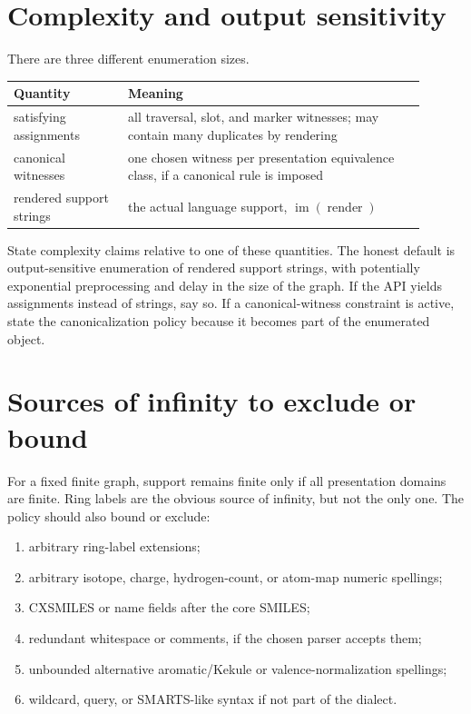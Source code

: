 \documentclass[10pt,a4paper]{article}
\newcommand{\render}{\operatorname{render}}
\newcommand{\im}{\operatorname{im}}
\theoremstyle{definition}
\theoremstyle{remark}
\begin{document}
\section{Complexity and output sensitivity}
\label{s:complexity}

There are three different enumeration sizes.

\begin{center}
\begin{tabular}{>{\raggedright\arraybackslash}p{0.25\linewidth}
                >{\raggedright\arraybackslash}p{0.65\linewidth}}
\toprule
Quantity & Meaning \\
\midrule
satisfying assignments &
all traversal, slot, and marker witnesses; may contain many duplicates by
rendering \\
canonical witnesses &
one chosen witness per presentation equivalence class, if a canonical rule is
imposed \\
rendered support strings &
the actual language support, \(\im(\render)\) \\
\bottomrule
\end{tabular}
\end{center}

State complexity claims relative to one of these quantities.  The honest default
is output-sensitive enumeration of rendered support strings, with potentially
exponential preprocessing and delay in the size of the graph.  If the API yields
assignments instead of strings, say so.  If a canonical-witness constraint is
active, state the canonicalization policy because it becomes part of the
enumerated object.

\section{Sources of infinity to exclude or bound}
\label{s:infinity}

For a fixed finite graph, support remains finite only if all presentation domains
are finite.  Ring labels are the obvious source of infinity, but not the only
one.  The policy should also bound or exclude:
\begin{enumerate}[leftmargin=*]
\item arbitrary ring-label extensions;
\item arbitrary isotope, charge, hydrogen-count, or atom-map numeric spellings;
\item CXSMILES or name fields after the core SMILES;
\item redundant whitespace or comments, if the chosen parser accepts them;
\item unbounded alternative aromatic/Kekule or valence-normalization spellings;
\item wildcard, query, or SMARTS-like syntax if not part of the dialect.
\end{enumerate}
\end{document}
